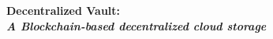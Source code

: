 {\huge\bfseries Decentralized Vault: \\ \mdseries \itshape \LARGE A Blockchain-based decentralized cloud storage\par}